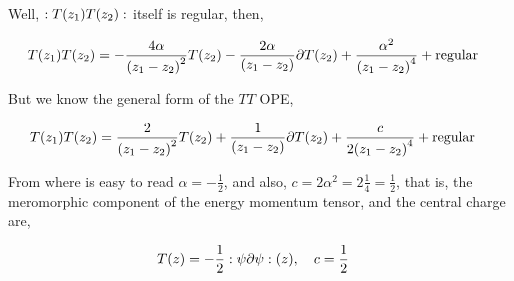 Well, $:T\qty(z_1)T\qty(z_2):$ itself is regular, then,

\begin{align*}
    { T\qty(z_1)T\qty(z_2)}&=-\frac{4\alpha}{\qty(z_1-z_2)^2}T\qty(z_2)-\frac{2\alpha}{\qty(z_1-z_2)}\partial T\qty(z_2)+\frac{\alpha^2}{\qty(z_1-z_2)^4}+\textnormal{regular}
\end{align*}

But we know the general form of the $TT$ OPE,

\begin{align*}
    { T\qty(z_1)T\qty(z_2)}&=\frac{2}{\qty(z_1-z_2)^2}T\qty(z_2)+\frac{1}{\qty(z_1-z_2)}\partial T\qty(z_2)+\frac{c}{2\qty(z_1-z_2)^4}+\textnormal{regular}
\end{align*}

From where is easy to read $\alpha=-\frac12$, and also, $c=2\alpha^2=2\frac14=\frac12$, that is, the meromorphic component of the 
energy momentum tensor, and the central charge are,

\begin{align*}
    T\qty(z)&=-\frac12\cnord{\psi\partial\psi}\qty(z),\ \ \ c=\frac12
\end{align*}

\probitem{}
\probitem{}
\probitem{}
\probitem{}